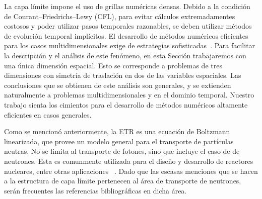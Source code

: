 La capa límite impone el uso de grillas numéricas densas. 
Debido a la condición de Courant--Friedrichs--Lewy (CFL), para evitar cálculos 
extremadamentes costosos y poder utilizar pasos temporales razonables, 
se deben utilizar métodos de evolución temporal implícitos. 
El desarrollo 
de métodos numéricos eficientes para los casos 
multidimensionales exige de estrategias sofisticadas~\cite{Bruno2019}. 
Para facilitar la descripción y el análisis 
de este fenómeno, en esta Sección trabajaremos con una única dimensión espacial. 
Esto se corresponde a problemas de tres dimensiones con simetría de traslación en dos 
de las variables espaciales. 
Las conclusiones que se obtienen 
de este análisis son generales, y se extienden naturalmente a problemas multidimensionales 
y en el dominio temporal. Nuestro trabajo 
sienta los cimientos para el desarrollo de métodos numéricos 
altamente eficientes en casos generales.

Como se mencionó anteriormente, la ETR es una ecuación de Boltzmann linearizada, 
que provee un modelo general para el transporte de partículas neutras. 
No se limita al transporte de fotones, sino que incluye el caso de 
de neutrones. Esta es comunmente utilizada 
para el diseño y desarrollo de reactores nucleares, entre otras aplicaciones~
\cite{Chandrasekhar1960,Case1967,Lewis1984,Petrovic1996,Hunter2015,Barichello2016,Hu2020}.  
Dado que las escasas menciones que se hacen a la estructura de capa límite 
pertenecen al área de transporte de neutrones, serán frecuentes las referencias 
bibliográficas en dicha área.

